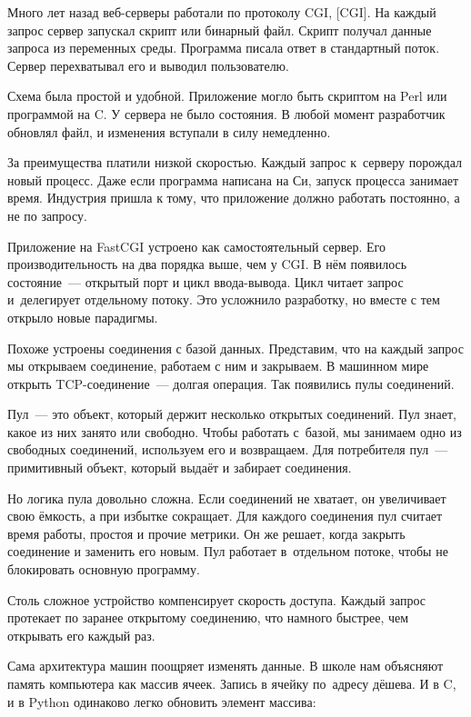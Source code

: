 Много лет назад веб-серверы работали по протоколу CGI,
[CGI].
На каждый запрос сервер запускал скрипт или бинарный файл. Скрипт получал данные
запроса из переменных среды. Программа писала ответ в стандартный поток. Сервер
перехватывал его и выводил пользователю.

Схема была простой и удобной. Приложение могло быть скриптом на Perl или
программой на C\Plus\Plus. У сервера не было состояния. В любой момент
разработчик обновлял файл, и изменения вступали в силу немедленно.

За преимущества платили низкой скоростью. Каждый запрос к~серверу порождал новый
процесс. Даже если программа написана на Си, запуск процесса занимает
время. Индустрия пришла к тому, что приложение должно работать постоянно, а не
по запросу.


Приложение на FastCGI устроено как самостоятельный сервер. Его
производительность на два порядка выше, чем у CGI. В нём появилось состояние~---
открытый порт и цикл ввода-вывода. Цикл читает запрос и~делегирует отдельному
потоку. Это усложнило разработку, но вместе с тем открыло новые парадигмы.

Похоже устроены соединения с базой данных. Представим, что на каждый запрос мы
открываем соединение, работаем с ним и закрываем. В машинном мире открыть
TCP-соединение~--- долгая операция. Так появились пулы соединений.


Пул~--- это объект, который держит несколько открытых соединений. Пул знает,
какое из них занято или свободно. Чтобы работать с~базой, мы занимаем одно из
свободных соединений, используем его и возвращаем. Для потребителя пул~---
примитивный объект, который выдаёт и забирает соединения.

Но логика пула довольно сложна. Если соединений не хватает, он увеличивает свою
ёмкость, а при избытке сокращает. Для каждого соединения пул считает время
работы, простоя и прочие метрики. Он же решает, когда закрыть соединение и
заменить его новым. Пул работает в~отдельном потоке, чтобы не блокировать
основную программу.

Столь сложное устройство компенсирует скорость доступа. Каждый запрос протекает
по заранее открытому соединению, что намного быстрее, чем открывать его каждый
раз.

Сама архитектура машин поощряет изменять данные. В школе нам объясняют память
компьютера как массив ячеек. Запись в ячейку по~адресу дёшева. И в C\Plus\Plus,
и в Python одинаково легко обновить элемент массива:


